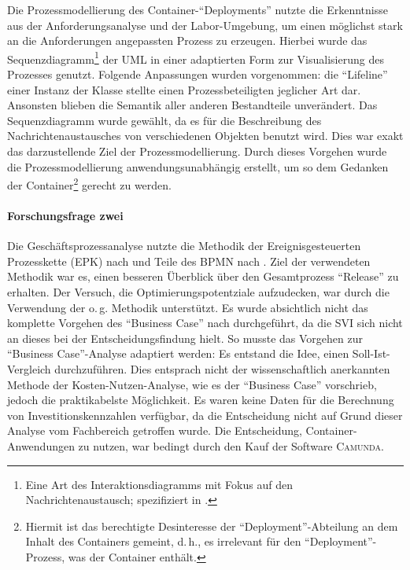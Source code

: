 Die Prozessmodellierung des Container-\enquote{Deployments} nutzte die Erkenntnisse aus der Anforderungsanalyse und der Labor-Umgebung, um einen möglichst stark an die Anforderungen angepassten Prozess zu erzeugen. Hierbei wurde das Sequenzdiagramm\footnote{Eine Art des Interaktionsdiagramms mit Fokus auf den Nachrichtenaustausch; spezifiziert in \cite[][S.\,595-599]{object_management_group_omg_unified_2017}.} der \ac{UML} in einer adaptierten Form zur Visualisierung des Prozesses genutzt. Folgende Anpassungen wurden vorgenommen: die \enquote{Lifeline} einer Instanz der Klasse stellte einen Prozessbeteiligten jeglicher Art dar. Ansonsten blieben die Semantik aller anderen Bestandteile unverändert. Das Sequenzdiagramm wurde gewählt, da es für die Beschreibung des Nachrichtenaustausches von verschiedenen Objekten benutzt wird. Dies war exakt das darzustellende Ziel der Prozessmodellierung. Durch dieses Vorgehen wurde die Prozessmodellierung anwendungsunabhängig erstellt, um so dem Gedanken der Container\footnote{Hiermit ist das berechtigte Desinteresse der \enquote{Deployment}-Abteilung an dem Inhalt des Containers gemeint, d.\,h., es irrelevant für den  \enquote{Deployment}-Prozess, was der Container enthält.} gerecht zu werden. 

\paragraph{Forschungsfrage zwei}
Die Geschäftsprozessanalyse nutzte die Methodik der Ereignisgesteuerten Prozesskette (\acs{EPK}) nach \cite{scheer_objektorientierte_1997} und Teile des \ac{BPMN} nach \cite{object_management_group_omg_business_2011}. Ziel der verwendeten Methodik war es, einen besseren Überblick über den Gesamtprozess \enquote{Release} zu erhalten. Der Versuch, die Optimierungspotentziale aufzudecken, war durch die Verwendung der o.\,g. Methodik unterstützt. Es wurde absichtlich nicht das komplette Vorgehen des \enquote{Business Case} nach \cite{brugger_it_2009} durchgeführt, da die \ac{SVI} sich nicht an dieses bei der Entscheidungsfindung hielt. So musste das Vorgehen zur \enquote{Business Case}-Analyse adaptiert werden: Es entstand die Idee, einen Soll-Ist-Vergleich durchzuführen. Dies entsprach nicht der wissenschaftlich anerkannten Methode der Kosten-Nutzen-Analyse, wie es der \enquote{Business Case} vorschrieb, jedoch die praktikabelste Möglichkeit. Es waren keine Daten für die Berechnung von Investitionskennzahlen verfügbar, da die Entscheidung nicht auf Grund dieser Analyse vom Fachbereich getroffen wurde. Die Entscheidung, Container-Anwendungen zu nutzen, war bedingt durch den Kauf der Software \textsc{Camunda}. 

